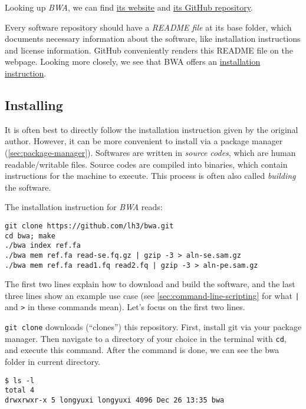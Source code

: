 \documentclass[12pt,letterpaper]{article}
\begin{document}
Looking up \textit{BWA}, we can find \href{https://bio-bwa.sourceforge.net/}{its website} and \href{https://github.com/lh3/bwa}{its GitHub repository}.

Every software repository should have a \textit{README file} at its base folder, which documents necessary information about the software, like installation instructions and license information. GitHub conveniently renders this README file on the webpage. Looking more closely, we see that BWA offers an \href{https://github.com/lh3/bwa}{installation instruction}.


\subsection{Installing}

It is often best to directly follow the installation instruction given by the original author. However, it can be more convenient to install via a package manager (\cref*{sec:package-manager}). Softwares are written in \textit{source codes}, which are human readable/writable files. Source codes are compiled into binaries, which contain instructions for the machine to execute. This process is often also called \textit{building} the software.

The installation instruction for \textit{BWA} reads:

\begin{verbatim}
git clone https://github.com/lh3/bwa.git
cd bwa; make
./bwa index ref.fa
./bwa mem ref.fa read-se.fq.gz | gzip -3 > aln-se.sam.gz
./bwa mem ref.fa read1.fq read2.fq | gzip -3 > aln-pe.sam.gz
\end{verbatim}

The first two lines explain how to download and build the software, and the last three lines show an example use case (see \cref*{sec:command-line-scripting} for what \texttt{|} and \texttt{>} in these commands mean). Let's focus on the first two lines.

\texttt{git clone} downloads (``clones'') this repository. First, install git via your package manager. Then navigate to a directory of your choice in the terminal with \texttt{cd}, and execute this command. After the command is done, we can see the bwa folder in current directory.

\begin{verbatim}
$ ls -l
total 4
drwxrwxr-x 5 longyuxi longyuxi 4096 Dec 26 13:35 bwa
\end{verbatim}
\end{document}
